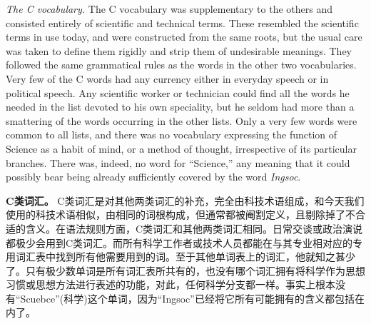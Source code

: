 \begin{paracol}{2}
\switchcolumn*

\sectionbreak

\switchcolumn

\sectionbreak

\switchcolumn*

\emph{The C vocabulary.} The C vocabulary was supplementary to the
others and consisted entirely of scientific and technical terms. These
resembled the scientific terms in use today, and were constructed from
the same roots, but the usual care was taken to define them rigidly and
strip them of undesirable meanings. They followed the same grammatical
rules as the words in the other two vocabularies. Very few of the C
words had any currency either in everyday speech or in political speech.
Any scientific worker or technician could find all the words he needed
in the list devoted to his own speciality, but he seldom had more than a
smattering of the words occurring in the other lists. Only a very few
words were common to all lists, and there was no vocabulary expressing
the function of Science as a habit of mind, or a method of thought,
irrespective of its particular branches. There was, indeed, no word for
``Science,'' any meaning that it could possibly bear being already
sufficiently covered by the word \emph{Ingsoc}.

\switchcolumn

\textbf{C类词汇。} C类词汇是对其他两类词汇的补充，完全由科技术语组成，和今天我们使用的科技术语相似，由相同的词根构成，但通常都被阉割定义，且剔除掉了不合适的含义。在语法规则方面，C类词汇和其他两类词汇相同。日常交谈或政治演说都极少会用到C类词汇。而所有科学工作者或技术人员都能在与其专业相对应的专用词汇表中找到所有他需要用到的词。至于其他单词表上的词汇，他就知之甚少了。只有极少数单词是所有词汇表所共有的，也没有哪个词汇拥有将科学作为思想习惯或思想方法进行表述的功能，对此，任何科学分支都一样。事实上根本没有``Scuebce''(科学)这个单词，因为``Ingsoc''已经将它所有可能拥有的含义都包括在内了。

\switchcolumn*

\sectionbreak

\switchcolumn

\sectionbreak

\switchcolumn*


\end{paracol}
